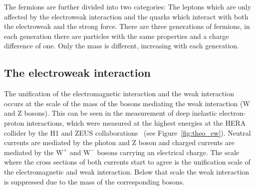 The fermions are further divided into two categories: The leptons which are only affected by the electroweak interaction and the quarks which interact with both the electroweak and the strong force.
There are three generations of fermions, in each generation there are particles with the same properties and a charge difference of one. Only the mass is different, increasing with each generation.

\subsection{The electroweak interaction}
\label{sec:theo_ew}

The unification of the electromagnetic interaction and the weak interaction occurs at the scale of the mass of the bosons mediating the weak interaction (W and Z bosons).
This can be seen in the measurement of deep inelastic electron-proton interactions, which were measured at the highest energies at the HERA collider by the H1 and ZEUS collaborations~\cite{Abramowicz:2015mha} (see Figure~\ref{fig:theo_ew}). Neutral currents are mediated by the photon and Z boson and charged currents are
mediated by the $\mathrm{W}^+$ and $\mathrm{W}^-$ bosons carrying an electrical charge. The scale where the cross sections of both currents start to agree is the unification scale of the electromagnetic and weak interaction.
Below that scale the weak interaction is suppressed due to the mass of the corresponding bosons.

